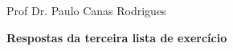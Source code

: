 
\usepackage{fullpage}      %
\usepackage{indentfirst}   %



\noindent Prof Dr. Paulo Canas Rodrigues
\\

\noindent \centerline{\textbf{Respostas da terceira lista de exercício}}
\\






